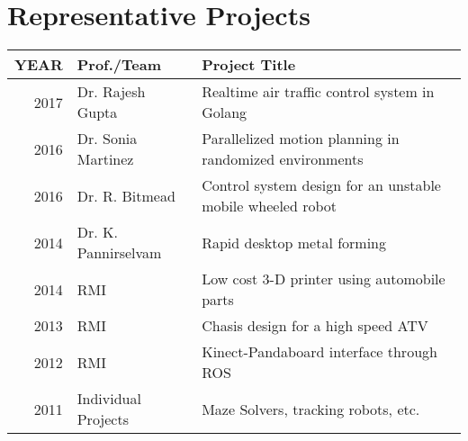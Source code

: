 \documentclass[]{deedy-resume-openfont}
\begin{document}
\begin{minipage}[t]{0.66\textwidth}
\newcommand\Topstrut{\rule{0pt}{2.1ex}}
\newcommand\Bottomstrut{\rule[-0.6ex]{0pt}{0pt}}

\section{Representative Projects}
\begin{tabular}{rll}

YEAR	     & Prof./Team  & Project Title \\
\hline
2017\rule{0pt}{3ex}	     & Dr. Rajesh Gupta & Realtime air traffic control system in Golang\\ 
2016         & Dr. Sonia Martinez & Parallelized motion planning in randomized environments\\
2016         &Dr. R. Bitmead & Control system design for an unstable mobile wheeled robot\\
2014	     & Dr. K. Pannirselvam  & Rapid desktop metal forming\\
2014	     & RMI  & Low cost 3-D printer using automobile parts\\
2013	     & RMI & Chasis design for a high speed ATV\\
2012	     & RMI & Kinect-Pandaboard interface through ROS\\
2011        &  Individual Projects & Maze Solvers, tracking robots, etc.\\
\end{tabular}
\sectionsep








\end{minipage} 
\end{document}
